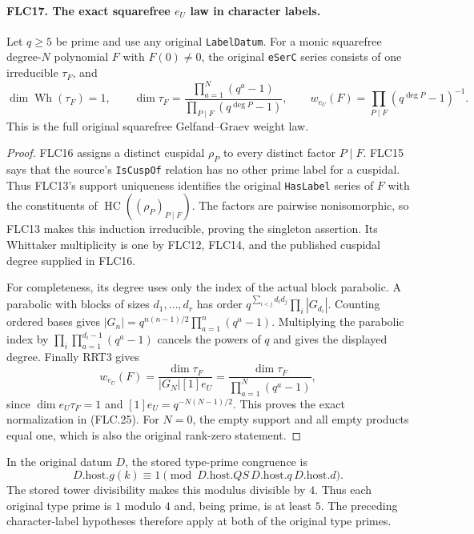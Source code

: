 \documentclass[11pt,a4paper]{article}
\numberwithin{equation}{section}
\theoremstyle{remark}\newtheorem{remark}[theorem]{Remark}
\begin{document}
\paragraph{FLC17. The exact squarefree $e_U$ law in character labels.}
\label{claim:FLC17}
Let $q\ge5$ be prime and use any original \texttt{Label\allowbreak Datum}.
For a monic squarefree degree-$N$ polynomial $F$ with
$F(0)\ne0$, the original \texttt{e\allowbreak Ser\allowbreak C} series consists of
one irreducible $\tau_F$, and
\[
 \dim\operatorname{Wh}(\tau_F)=1,\qquad
 \dim\tau_F=
       \frac{\prod_{a=1}^{N}(q^a-1)}
                         {\prod_{P\mid F}(q^{\deg P}-1)},\qquad
 w_{e_U}(F)=\prod_{P\mid F}(q^{\deg P}-1)^{-1}.
 \tag{FLC.25}
\]
This is the full original squarefree Gelfand--Graev weight law.
\begin{proof}
FLC16 assigns a distinct cuspidal $\rho_P$ to every distinct
factor $P\mid F$.  FLC15 says that the source's
\texttt{Is\allowbreak Cusp\allowbreak Of} relation has no other prime label for a
cuspidal.  Thus FLC13's support uniqueness identifies the
original \texttt{Has\allowbreak Label} series of $F$ with the constituents
of $\operatorname{HC}((\rho_P)_{P\mid F})$.
The factors are pairwise nonisomorphic, so FLC13 makes this
induction irreducible, proving the singleton assertion.
Its Whittaker multiplicity is one by FLC12, FLC14, and the
published cuspidal degree supplied in FLC16.

For completeness, its degree uses only the index of the
actual block parabolic.  A parabolic with blocks of sizes
$d_1,\ldots,d_r$ has order
$q^{\sum_{i<j}d_id_j}\prod_i|G_{d_i}|$.
Counting ordered bases gives
$|G_n|=q^{n(n-1)/2}\prod_{a=1}^n(q^a-1)$.
Multiplying the parabolic index by
$\prod_i\prod_{a=1}^{d_i-1}(q^a-1)$ cancels the powers of
$q$ and gives the displayed degree.  Finally RRT3 gives
\[
 w_{e_U}(F)=\frac{\dim\tau_F}{|G_N|[1]e_U}
          =\frac{\dim\tau_F}{\prod_{a=1}^{N}(q^a-1)},
\]
since $\dim e_U\tau_F=1$ and $[1]e_U=q^{-N(N-1)/2}$.
This proves the exact normalization in (FLC.25).
For $N=0$, the empty support and all empty products equal one,
which is also the original rank-zero statement.
\end{proof}

In the original datum $D$, the stored type-prime congruence is
\[
D.\mathrm{host}.g(k)\equiv1\pmod{D.\mathrm{host}.QS\,
D.\mathrm{host}.q\,D.\mathrm{host}.d}.
\]
The stored tower divisibility makes this modulus divisible by
$4$.  Thus each original type prime is $1$ modulo $4$ and,
being prime, is at least $5$.  The preceding character-label
hypotheses therefore apply at both of the original type primes.
\end{document}

